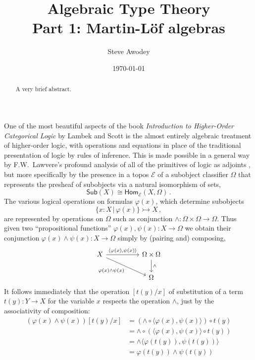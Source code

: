 \documentclass[12pt,reqno]{amsart}
\newcommand{\EE}{\ensuremath{\mathcal{E}}}
\newcommand{\Hom}{\ensuremath{\mathsf{Hom}}}
\newcommand{\mono}{\ensuremath{\rightarrowtail}}
\renewcommand{\to}{\ensuremath{\rightarrow}}
\theoremstyle{remark}
\theoremstyle{definition}
\begin{document}

\title{Algebraic Type Theory\\
Part 1: {M}artin-{L}\"of algebras}
\author{Steve Awodey}
\date{\today}

\begin{abstract}
A very brief abstract.
\end{abstract}
\maketitle

One of the most beautiful aspects of the book \emph{Introduction to Higher-Order Categorical Logic} by Lambek and Scott is the almost entirely algebraic treatment of higher-order logic, with operations and equations in place of the traditional presentation of logic by rules of inference.   This is made possible in a general way by F.W.\ Lawvere's profound analysis of all of the primitives of logic as adjoints \cite{Lawvere:adjointness}, but more specifically by the presence in a topos $\EE$ of a subobject classifier $\Omega$ that represents the presheaf of subobjects via a natural isomorphism of sets,
\[
\mathsf{Sub}(X) \cong \Hom_{\EE}(X, \Omega)\,.
\]
The various logical operations on formulas $\varphi(x)$, which determine subobjects $$\{x:X\, |\, \varphi(x)\} \mono X\,,$$ are represented by operations on $\Omega$ such as conjunction $\wedge : \Omega \times \Omega \to \Omega$.  Thus given two ``propositional functions'' $\varphi(x), \psi(x) : X \to \Omega$ we obtain their conjunction $\varphi(x)\wedge\psi(x) : X \to \Omega$ simply by (pairing and) composing,
\begin{equation*}
\begin{tikzcd}
 X \ar[rr, "{\langle \varphi(x), \psi(x) \rangle}" ] \ar[rrd,swap,  "\varphi(x)\wedge\psi(x)"] && \Omega \times \Omega \ar[d, "\wedge"] \\
 && \Omega 
\end{tikzcd}
\end{equation*}
It follows immediately that the operation $[t(y)/x]$ of substitution of a term $t(y) : Y\to X$ for the variable $x$ respects the operation $\wedge$, just by the associativity of composition:
\begin{align*}
(\varphi(x)\wedge\psi(x))[t(y)/x] &= (\wedge \circ \langle \varphi(x), \psi(x) \rangle) \circ t(y)\\
&= \wedge \circ (\langle \varphi(x), \psi(x) \rangle \circ t(y))\\
&=  \wedge  \langle \varphi(t(y)), \psi(t(y))\rangle \\
&=  \varphi(t(y))\wedge\psi(t(y)) 
\end{align*}
\end{document}
